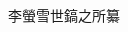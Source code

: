 \documentclass[a4paper,landscape,12pt]{memoir}
\begin{document}
\frontmatter
\hspace{0pt}
\vfill
{李螢雪世鎬之所纂}\\
{\vspace{14pt}}
\vspace{14pt}
\newpage
\linespread{1.25}

\mainmatter
\linespread{1.25}
\begin{multicols}{5}

\end{multicols}
\end{document}
